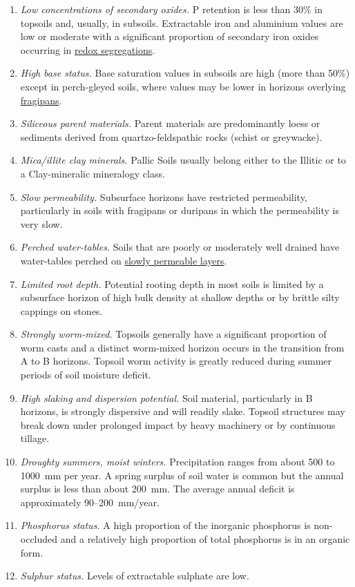 \documentclass[
  letterpaper,
  DIV=11,
  numbers=noendperiod]{scrreprt}
\providecommand{\tightlist}{%
  \setlength{\itemsep}{0pt}\setlength{\parskip}{0pt}}\usepackage{longtable,booktabs,array}
\begin{document}
\begin{enumerate}
\def\labelenumi{\arabic{enumi}.}
\tightlist
\item
  \emph{Low concentrations of secondary oxides.} P retention is less
  than 30\% in topsoils and, usually, in subsoils. Extractable iron and
  aluminium values are low or moderate with a significant proportion of
  secondary iron oxides occurring in
  \protect\hyperlink{sec-diag-rsegs}{redox segregations}.
\item
  \emph{High base status.} Base saturation values in subsoils are high
  (more than 50\%) except in perch-gleyed soils, where values may be
  lower in horizons overlying
  \protect\hyperlink{sec-diag-fpan}{fragipans}.
\item
  \emph{Siliceous parent materials.} Parent materials are predominantly
  loess or sediments derived from quartzo-feldspathic rocks (schist or
  greywacke).
\item
  \emph{Mica/illite clay minerals.} Pallic Soils usually belong either
  to the Illitic or to a Clay-mineralic mineralogy class.
\item
  \emph{Slow permeability.} Subsurface horizons have restricted
  permeability, particularly in soils with fragipans or duripans in
  which the permeability is very slow.
\item
  \emph{Perched water-tables.} Soils that are poorly or moderately well
  drained have water-tables perched on
  \protect\hyperlink{sec-diag-slowp}{slowly permeable layers}.
\item
  \emph{Limited root depth.} Potential rooting depth in most soils is
  limited by a subsurface horizon of high bulk density at shallow depths
  or by brittle silty cappings on stones.
\item
  \emph{Strongly worm-mixed.} Topsoils generally have a significant
  proportion of worm casts and a distinct worm-mixed horizon occurs in
  the transition from A to B horizons. Topsoil worm activity is greatly
  reduced during summer periods of soil moisture deficit.
\item
  \emph{High slaking and dispersion potential.} Soil material,
  particularly in B horizons, is strongly dispersive and will readily
  slake. Topsoil structures may break down under prolonged impact by
  heavy machinery or by continuous tillage.
\item
  \emph{Droughty summers, moist winters.} Precipitation ranges from
  about 500 to 1000~mm per year. A spring surplus of soil water is
  common but the annual surplus is less than about 200~mm. The average
  annual deficit is approximately 90--200~mm/year.
\item
  \emph{Phosphorus status.} A high proportion of the inorganic
  phosphorus is non-occluded and a relatively high proportion of total
  phosphorus is in an organic form.
\item
  \emph{Sulphur status.} Levels of extractable sulphate are low.
\end{enumerate}
\end{document}
